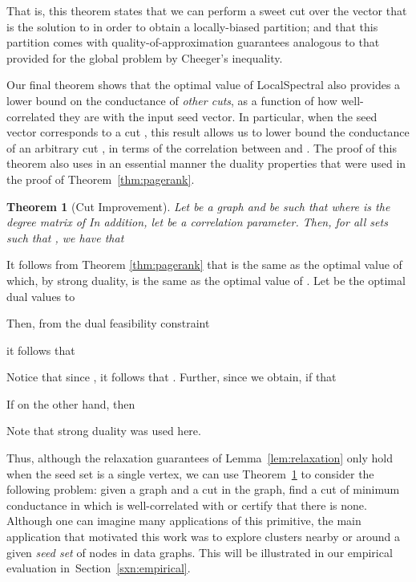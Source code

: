 \documentclass[11pt]{article}
\newtheorem{theorem}{Theorem}
\newenvironment{proof}{\noindent {\em Proof:}}{\\\hspace*{\fill}\mbox{}}
\begin{document}
\noindent
That is, this theorem states that we can perform a sweet cut over the vector 
that is the solution to  in order 
to obtain a locally-biased partition; and that this partition comes with 
quality-of-approximation guarantees analogous to that provided for the 
global problem  by Cheeger's inequality.

Our final theorem shows that the optimal value of \textsf{LocalSpectral}
also provides a lower bound on the conductance of \emph{other cuts}, as a function 
of how well-correlated they are with the input seed vector.
In particular, when the seed vector corresponds to a cut , this result
allows us to lower bound the conductance of an arbitrary cut , in terms
of the correlation between  and .
The proof of this theorem 
also uses in an essential manner the
duality properties that were used in the 
proof of Theorem~\ref{thm:pagerank}.

\begin{theorem}[Cut Improvement]
\label{thm:improve}
Let  be a  graph and  be such that
 where  is the degree matrix of 
In addition, let  be a correlation parameter.
Then, for all sets  such that
, we have that

\end{theorem}
\begin{proof}
It follows from Theorem \ref{thm:pagerank} that  is the 
same as the optimal value of  which, by strong 
duality, is the same as the optimal value of . 
Let  be the optimal dual values to 
 
Then, from the dual feasibility constraint 

it follows that 

Notice that since , it follows that 
.
Further, since  we obtain, if  that  

If on the other hand,  then

Note that strong duality was used here. 
\end{proof}

\noindent
Thus, although the relaxation guarantees of Lemma~\ref{lem:relaxation} only 
hold when the seed set is a single vertex, we can use 
Theorem~\ref{thm:improve} to consider the following problem: given a graph 
 and a cut  in the graph, find a cut of minimum conductance 
in  which is well-correlated with  or certify that there is none. 
Although one can imagine many applications of this primitive, the main 
application that motivated this work was to explore  clusters nearby or 
around a given \emph{seed set} of nodes in data graphs.  
This will be illustrated in our empirical evaluation 
in~Section~\ref{sxn:empirical}. 
\end{document}
